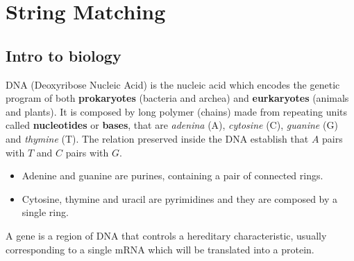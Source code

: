 \chapter{String Matching}

\section{Intro to biology}
DNA (Deoxyribose Nucleic Acid) is the nucleic acid which encodes the genetic program of both \textbf{prokaryotes} (bacteria and archea) and \textbf{eurkaryotes} (animals and plants). It is composed by long polymer (chains) made from repeating units called \textbf{nucleotides} or \textbf{bases}, that are \textit{adenina} (A), \textit{cytosine} (C), \textit{guanine} (G) and \textit{thymine} (T). The relation preserved inside the DNA establish that $A$ pairs with $T$ and $C$ pairs with $G$.

\begin{itemize}
	\item Adenine and guanine are purines, containing a pair of connected rings.
	\item Cytosine, thymine and uracil are pyrimidines and they are composed by a single ring.
\end{itemize}

A gene is a region of DNA that controls a hereditary characteristic, usually corresponding to a single mRNA which will be translated into a protein.

